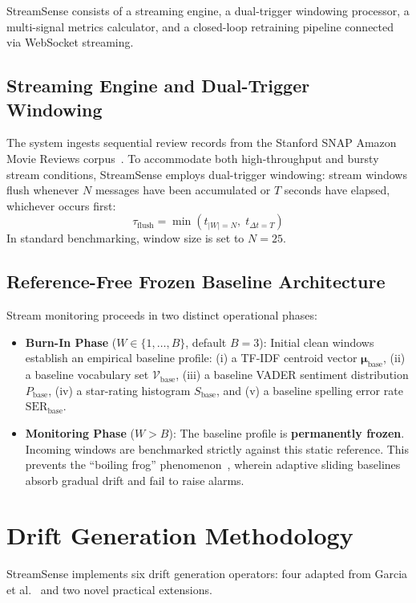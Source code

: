 \documentclass[conference]{IEEEtran}
\begin{document}
StreamSense consists of a streaming engine, a dual-trigger windowing processor, a multi-signal metrics calculator, and a closed-loop retraining pipeline connected via WebSocket streaming.

\subsection{Streaming Engine and Dual-Trigger Windowing}
The system ingests sequential review records from the Stanford SNAP Amazon Movie Reviews corpus~\cite{mcauley2013amateurs}. To accommodate both high-throughput and bursty stream conditions, StreamSense employs dual-trigger windowing: stream windows flush whenever $N$ messages have been accumulated or $T$ seconds have elapsed, whichever occurs first:
\begin{equation}
\tau_{\text{flush}} = \min(t_{|W| = N}, \; t_{\Delta t = T})
\end{equation}
In standard benchmarking, window size is set to $N=25$.

\subsection{Reference-Free Frozen Baseline Architecture}
Stream monitoring proceeds in two distinct operational phases:
\begin{itemize}
    \item \textbf{Burn-In Phase} ($W \in \{1, \dots, B\}$, default $B = 3$): Initial clean windows establish an empirical baseline profile: (i) a TF-IDF centroid vector $\boldsymbol{\mu}_{\text{base}}$, (ii) a baseline vocabulary set $\mathcal{V}_{\text{base}}$, (iii) a baseline VADER sentiment distribution $P_{\text{base}}$, (iv) a star-rating histogram $S_{\text{base}}$, and (v) a baseline spelling error rate $\text{SER}_{\text{base}}$.
    \item \textbf{Monitoring Phase} ($W > B$): The baseline profile is \textbf{permanently frozen}. Incoming windows are benchmarked strictly against this static reference. This prevents the ``boiling frog'' phenomenon~\cite{bifet2007learning}, wherein adaptive sliding baselines absorb gradual drift and fail to raise alarms.
\end{itemize}

\section{Drift Generation Methodology}

StreamSense implements six drift generation operators: four adapted from Garcia et al.~\cite{garcia2024methods} and two novel practical extensions.
\end{document}
